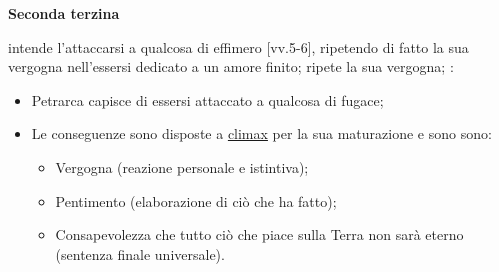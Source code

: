 \documentclass{article}
\begin{document}
\begin{enumerate}
\begin{itemize}[label=]
        \textbf{Seconda terzina}
            \begin{enumerate}[label=]
                 intende l'attaccarsi a qualcosa di effimero [vv.5-6],
                    ripetendo di fatto la sua vergogna nell'essersi dedicato a un amore finito;
                 ripete la sua vergogna;
                :
                        \begin{itemize}
                            \item Petrarca capisce di essersi attaccato a qualcosa di fugace;
                            \item Le conseguenze sono disposte a \underline{climax} per la sua
                                maturazione e sono sono:
                                \begin{itemize}
                                    \item Vergogna (reazione personale e istintiva);
                                    \item Pentimento (elaborazione di ciò che ha fatto);
                                    \item Consapevolezza che tutto ciò che piace sulla Terra
                                        non sarà eterno (sentenza finale universale).
                                \end{itemize}
                        \end{itemize}
            \end{enumerate}
    \end{itemize}


\end{enumerate}
\end{document}
